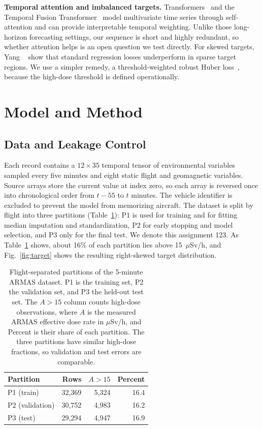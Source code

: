 \documentclass[10pt,twocolumn,letterpaper]{article}
\begin{document}
\textbf{Temporal attention and imbalanced targets.}
Transformers~\cite{vaswani2017} and the Temporal Fusion
Transformer~\cite{lim2021} model multivariate time series through
self-attention and can provide interpretable temporal weighting. Unlike those
long-horizon forecasting settings, our sequence is short and highly
redundant, so whether attention helps is an open question we test directly.
For skewed targets, Yang \etal~\cite{yang2021} show that standard regression
losses underperform in sparse target regions. We use a simpler remedy, a
threshold-weighted robust Huber loss~\cite{huber1964}, because the
high-dose threshold is defined operationally.

\section{Model and Method}
\label{sec:method}

\subsection{Data and Leakage Control}
Each record contains a $12\times35$ temporal tensor of environmental
variables sampled every five minutes and eight static flight and geomagnetic
variables. Source arrays store the current value at index zero, so each array
is reversed once into chronological order from $t-55$ to $t$ minutes. The
vehicle identifier is excluded to prevent the model from memorizing aircraft.
The dataset is split by flight into three partitions
(Table~\ref{tab:partitions}): P1 is used for training and for fitting median
imputation and standardization, P2 for early stopping and model selection,
and P3 only for the final test. We denote this assignment 123. As
Table~\ref{tab:partitions} shows, about 16\% of each partition lies above
15~$\mu$Sv/h, and Fig.~\ref{fig:target} shows the resulting right-skewed
target distribution.

\begin{table}[t]
\caption{Flight-separated partitions of the 5-minute ARMAS dataset. P1 is the
training set, P2 the validation set, and P3 the held-out test set. The
$A>15$ column counts high-dose observations, where $A$ is the measured ARMAS
effective dose rate in $\mu$Sv/h, and Percent is their share of each
partition. The three partitions have similar high-dose fractions, so
validation and test errors are comparable.}
\label{tab:partitions}
\centering\small
\begin{tabular}{lrrr}\toprule
Partition & Rows & $A>15$ & Percent \\ \midrule
P1 (train) & 32,369 & 5,324 & 16.4 \\
P2 (validation) & 30,752 & 4,983 & 16.2 \\
P3 (test) & 29,294 & 4,947 & 16.9 \\ \bottomrule
\end{tabular}
\end{table}
\end{document}
